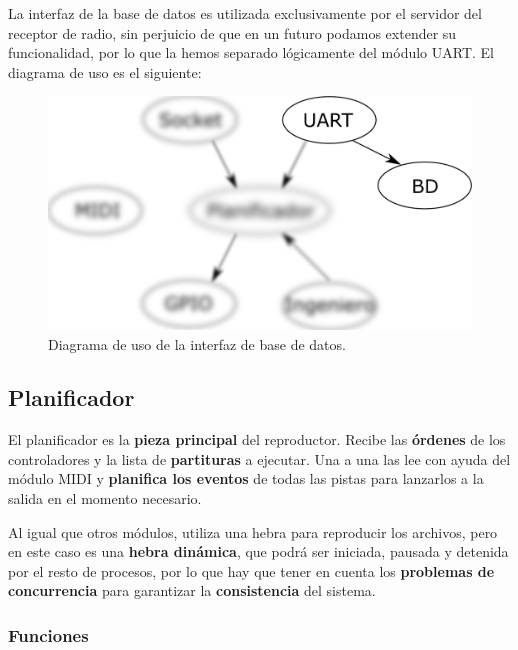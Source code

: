 La interfaz de la base de datos es utilizada exclusivamente por el servidor del receptor de radio, sin perjuicio de que en un futuro podamos extender su funcionalidad, por lo que la hemos separado lógicamente del módulo \acrshort{UART}. El diagrama de uso es el siguiente:

\smallskip

\begin{figure}[H]
	\noindent \begin{centering}
		\includegraphics[width=\linewidth/2]{capitulo4/daemon_bd}
		\par\end{centering}
	\smallskip
	\caption{\label{fig:daemon_bd} Diagrama de uso de la interfaz de base de datos.}
\end{figure} 

\smallskip

\subsection{Planificador}
\label{subsec:planificador}

El planificador es la \textbf{pieza principal} del reproductor. Recibe las \textbf{órdenes} de los controladores y la lista de \textbf{partituras} a ejecutar. Una a una las lee con ayuda del módulo \acrshort{MIDI} y \textbf{planifica los eventos} de todas las pistas para lanzarlos a la salida en el momento necesario.

Al igual que otros módulos, utiliza una hebra para reproducir los archivos, pero en este caso es una \textbf{hebra dinámica}, que podrá ser iniciada, pausada y detenida por el resto de procesos, por lo que hay que tener en cuenta los \textbf{problemas de concurrencia} para garantizar la \textbf{consistencia} del sistema.

\subsubsection{Funciones}

